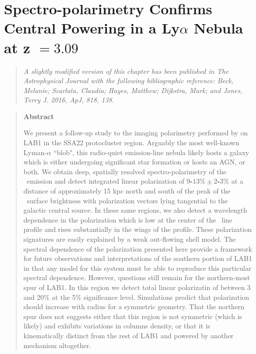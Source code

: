 

\chapter{Spectro-polarimetry Confirms Central Powering in a Ly$\alpha$ Nebula at z $= 3.09$} 
\label{app:LAB1}

\begin{quote}
\emph{A slightly modified version of this chapter has been published in The Astrophysical Journal with the following bibliographic reference:  Beck, Melanie; Scarlata, Claudia; Hayes, Matthew; Dijkstra, Mark; and Jones, Terry J. 2016, ApJ, 818, 138.}\\
\end{quote}

\begin{quote}
\begin{center}\textbf{Abstract}\end{center}
We present a follow-up study to the imaging polarimetry performed by \cite{HayesScarlata2011} on LAB1 in the SSA22 protocluster region. Arguably the most well-known Lyman-$\alpha$ ``blob", this radio-quiet emission-line nebula likely hosts a galaxy which is either undergoing significant star formation or hosts an AGN, or both. We obtain deep, spatially resolved spectro-polarimetry of the \lya~emission and detect integrated linear polarization of \textbf{$9$-$13\%\pm2$-$3\%$} at a distance of approximately 15 kpc north and south of the peak of the \lya~surface brightness with polarization vectors lying tangential to the galactic central source. In these same regions, we also detect a wavelength dependence in the polarization which is low at the center of the \lya~line profile and rises substantially in the wings of the profile. These polarization signatures are easily explained by a weak out-flowing shell model. The spectral dependence of the polarization presented here provide a framework for future observations and interpretations of the southern portion of LAB1 in that any model for this system must be able to reproduce this particular spectral dependence.
However, questions still remain for the northern-most spur of LAB1. In this region we detect total linear polarizatin of between 3 and 20\% at the 5\% significance level. Simulations predict that polarization should increase with radius for a symmetric geometry. That the northern spur does not suggests either that this region is not symmetric (which is likely) and exhibits variations in columns density, or that it is kinematically distinct from the rest of LAB1 and powered by another mechanism altogether.  
\end{quote}



